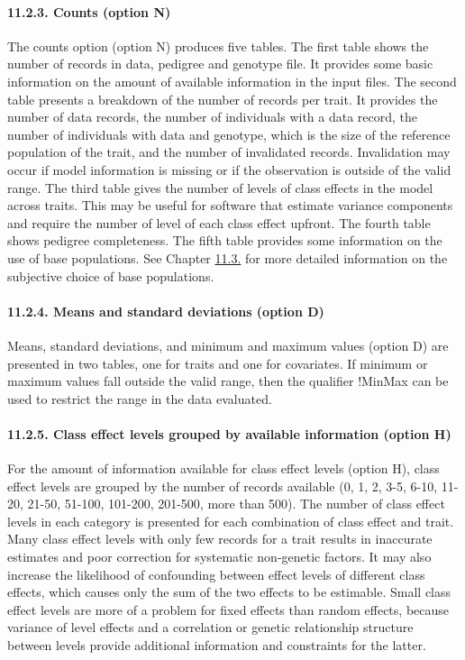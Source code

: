 \paragraph{11.2.3. Counts (option N)}\label{Desc06}

The counts option (option N) produces five tables. The first table shows
the number of records in data, pedigree and genotype file. It provides
some basic information on the amount of available information in the
input files. The second table presents a breakdown of the number of
records per trait. It provides the number of data records, the number of
individuals with a data record, the number of individuals with data and
genotype, which is the size of the reference population of the trait,
and the number of invalidated records. Invalidation may occur if model
information is missing or if the observation is outside of the valid
range. The third table gives the number of levels of class effects in
the model across traits. This may be useful for software that estimate
variance components and require the number of level of each class effect
upfront. The fourth table shows pedigree completeness. The fifth table
provides some information on the use of base populations. See Chapter
\hyperref[Desc11]{11.3.} for more detailed information on the subjective
choice of base populations.

\paragraph{11.2.4. Means and standard deviations (option
D)}\label{Desc07}

Means, standard deviations, and minimum and maximum values (option D)
are presented in two tables, one for traits and one for covariates. If
minimum or maximum values fall outside the valid range, then the
qualifier !MinMax can be used to restrict the range in the data
evaluated.

\paragraph{11.2.5. Class effect levels grouped by available information
(option H)}\label{Desc08}

For the amount of information available for class effect levels (option
H), class effect levels are grouped by the number of records available
(0, 1, 2, 3-5, 6-10, 11-20, 21-50, 51-100, 101-200, 201-500, more than
500). The number of class effect levels in each category is presented
for each combination of class effect and trait. Many class effect levels
with only few records for a trait results in inaccurate estimates and
poor correction for systematic non-genetic factors. It may also increase
the likelihood of confounding between effect levels of different class
effects, which causes only the sum of the two effects to be estimable.
Small class effect levels are more of a problem for fixed effects than
random effects, because variance of level effects and a correlation or
genetic relationship structure between levels provide additional
information and constraints for the latter.


